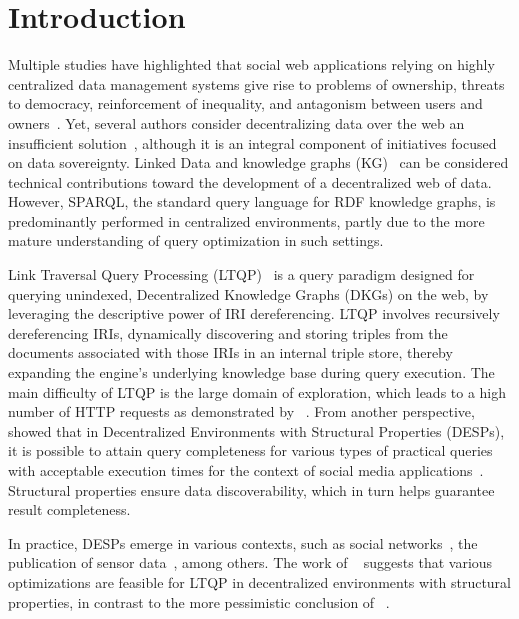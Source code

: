 \section{Introduction}

Multiple studies have highlighted that social web applications relying on highly centralized data management systems give rise to problems of ownership, threats to democracy, reinforcement of inequality, and antagonism between users and owners~\cite{Terranova2000FreeLP, Curran2016ch1, Sevignani2013, 9663788}.
Yet, several authors consider decentralizing data over the web an insufficient solution~\cite{9663788, Curran2016ch1}, although it is an integral component of initiatives focused on data sovereignty.
Linked Data and knowledge graphs (KG)~\cite{heath2011} can be considered technical contributions toward the development of a decentralized web of data.
However, SPARQL, the standard query language for RDF knowledge graphs, is predominantly performed in centralized environments, partly due to the more mature understanding of query optimization in such settings.

Link Traversal Query Processing (LTQP)~\cite{Hartig2012} is a query paradigm designed for querying unindexed, Decentralized Knowledge Graphs (DKGs) on the web, by leveraging the descriptive power of IRI dereferencing.
LTQP involves recursively dereferencing IRIs, dynamically discovering and storing triples from the documents associated with those IRIs in an internal triple store, thereby expanding the engine’s underlying knowledge base during query execution.
The main difficulty of LTQP is the large domain of exploration, which leads to a high number of HTTP requests as demonstrated by \citeauthor{hartig2016walking}~\cite{hartig2016walking}.
From another perspective, \citeauthor{Taelman2023}~\cite{Taelman2023} showed that in Decentralized Environments with Structural Properties (DESPs), it is possible to attain query completeness for various types of practical queries with acceptable execution times for the context of social media applications~\cite{nielsen1993response}.
Structural properties ensure data discoverability, which in turn helps guarantee result completeness.

In practice, DESPs emerge in various contexts, such as social networks~\cite{Taelman2023}, the publication of sensor data~\cite{tam_iswc_traversalsensortree_2024}, among others.
The work of \citeauthor{Taelman2023}~\cite{Taelman2023} suggests that various optimizations are feasible for LTQP in decentralized environments with structural properties, in contrast to the more pessimistic conclusion of \citeauthor{hartig2016walking}~\cite{hartig2016walking}.

